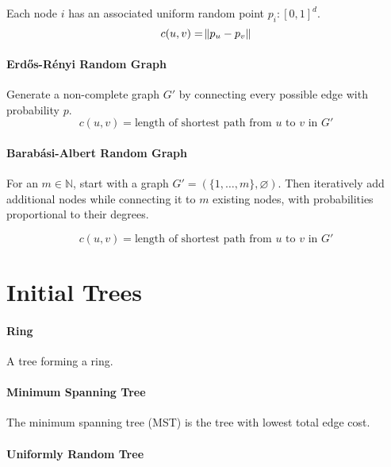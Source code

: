 \documentclass[a4paper, oneside]{discothesis}
\begin{document}
Each node $i$ has an associated uniform random point $p_i:[0,1]^d$.
\begin{equation}
c(u,v)=\norm{p_u-p_v}
\end{equation}

\paragraph{Erdős-Rényi Random Graph}

Generate a non-complete graph $G'$ by connecting every possible edge with probability $p$.
\begin{equation}
c(u,v)=\text{length of shortest path from $u$ to $v$ in $G'$}
\end{equation}

\paragraph{Barabási-Albert Random Graph}

For an $m\in\mathbb{N}$, start with a graph $G'=(\{1,\dots,m\},\varnothing)$. Then iteratively add additional nodes while connecting it to $m$ existing nodes, with probabilities proportional to their degrees.

\begin{equation}
c(u,v)=\text{length of shortest path from $u$ to $v$ in $G'$}
\end{equation}

\section{Initial Trees}

\paragraph{Ring}

A tree forming a ring.

\paragraph{Minimum Spanning Tree}

The minimum spanning tree (MST) is the tree with lowest total edge cost.

\paragraph{Uniformly Random Tree}
\end{document}
